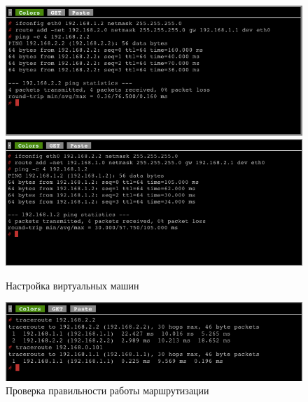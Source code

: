 \begin{figure}
  \centering
  \includegraphics[width=14cm]{fig/example-pc-setup-1.png}
  \includegraphics[width=14cm]{fig/example-pc-setup-2.png}
  \caption{Настройка виртуальных машин}
  \label{fig:example-pc-setup}
\end{figure}

\begin{figure}
  \centering
  \includegraphics[width=14cm]{fig/example-pc-traceroute.png}
  \caption{Проверка правильности работы маршрутизации}
  \label{fig:example-pc-traceroute}
\end{figure}



